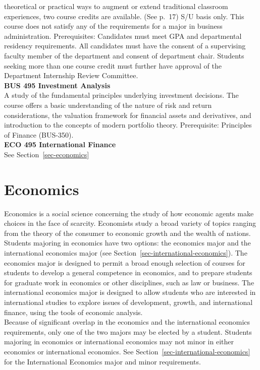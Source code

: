 \documentclass[
  letterpaper,
]{scrbook}
\begin{document}
theoretical or practical ways to augment or extend traditional classroom
experiences, two course credits are available. (See p.~17) S/U basis
only. This course does not satisfy any of the requirements for a major
in business administration. Prerequisites: Candidates must meet GPA and
departmental residency requirements. All candidates must have the
consent of a supervising faculty member of the department and consent of
department chair. Students seeking more than one course credit must
further have approval of the Department Internship Review Committee.\\
\textbf{BUS 495 Investment Analysis}\\
A study of the fundamental principles underlying investment decisions.
The course offers a basic understanding of the nature of risk and return
considerations, the valuation framework for financial assets and
derivatives, and introduction to the concepts of modern portfolio
theory. Prerequisite: Principles of Finance (BUS-350).\\
\textbf{ECO 495 International Finance}\\
See Section~\ref{sec-economics}

\section{Economics}\label{economics}

Economics is a social science concerning the study of how economic
agents make choices in the face of scarcity. Economists study a broad
variety of topics ranging from the theory of the consumer to economic
growth and the wealth of nations. Students majoring in economics have
two options: the economics major and the international economics major
(see Section~\ref{sec-international-economics}). The economics major is
designed to permit a broad enough selection of courses for students to
develop a general competence in economics, and to prepare students for
graduate work in economics or other disciplines, such as law or
business. The international economics major is designed to allow
students who are interested in international studies to explore issues
of development, growth, and international finance, using the tools of
economic analysis.\\
Because of significant overlap in the economics and the international
economics requirements, only one of the two majors may be elected by a
student. Students majoring in economics or international economics may
not minor in either economics or international economics. See
Section~\ref{sec-international-economics} for the International
Economics major and minor requirements.
\end{document}
